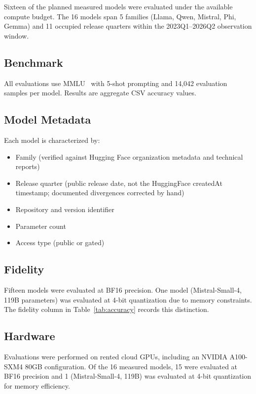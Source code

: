 \documentclass[journal]{IEEEtran}
\begin{document}
Sixteen of the planned measured models were evaluated under the available compute budget. The 16 models span 5 families (Llama, Qwen, Mistral, Phi, Gemma) and 11 occupied release quarters within the 2023Q1--2026Q2 observation window.

\subsection{Benchmark}

All evaluations use MMLU~\cite{hendrycks2021} with 5-shot prompting and 14,042 evaluation samples per model. Results are aggregate CSV accuracy values.

\subsection{Model Metadata}

Each model is characterized by:
\begin{itemize}
\item Family (verified against Hugging Face organization metadata and technical reports)
\item Release quarter (public release date, not the HuggingFace createdAt timestamp; documented divergences corrected by hand)
\item Repository and version identifier
\item Parameter count
\item Access type (public or gated)
\end{itemize}

\subsection{Fidelity}

Fifteen models were evaluated at BF16 precision. One model (Mistral-Small-4, 119B parameters) was evaluated at 4-bit quantization due to memory constraints. The fidelity column in Table~\ref{tab:accuracy} records this distinction.

\subsection{Hardware}

Evaluations were performed on rented cloud GPUs, including an NVIDIA A100-SXM4 80GB configuration. Of the 16 measured models, 15 were evaluated at BF16 precision and 1 (Mistral-Small-4, 119B) was evaluated at 4-bit quantization for memory efficiency.
\end{document}
